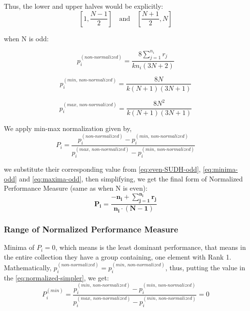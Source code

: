 \documentclass[a4paper,fleqn,review]{cas-sc}
\begin{document}
Thus, the lower and upper halves would be explicitly:
\[
\left[1, \frac{N-1}{2}\right] \quad \text{and} \quad \left[\frac{N+1}{2}, N\right]
\]

when N is odd:

\begin{equation}
	\label{eq:even-SUDH-odd}
	p_i^{(non\text{-}normalized)} = \frac{8 \sum_{j=1}^{n_i} r_j}{k n_i (3N + 2)}
\end{equation}

\begin{equation}
	\label{eq:minima-odd}
	p_i^{(min, \, non\text{-}normalized)} = \frac{8N}{k (N+1)(3N+1)}
\end{equation}

\begin{equation}
	\label{eq:maxima-odd}
	p_i^{(max, \, non\text{-}normalized)} = \frac{8N^2}{k (N+1)(3N+1)}
\end{equation}


We apply min-max normalization given by,
\begin{equation}
	P_i = \frac{p_i^{(non\text{-}normalized)} - p_i^{(min, \, non\text{-}normalized)}}{p_i^{(max, \, non\text{-}normalized)} - p_i^{(min, \, non\text{-}normalized)}}
\end{equation}

we substitute their corresponding value from
\autoref{eq:even-SUDH-odd}, \autoref{eq:minima-odd} and \autoref{eq:maxima-odd}, then simplifying, we get the final form of Normalized Performance Measure (same as when N is even):
\begin{equation}
	\boxed{
		\mathbf{
			P_i = \frac{-n_i +  \sum\limits_{j=1}^{n_i} r_j}{n_i \cdot (N - 1)}}
	}
\end{equation}


\subsubsection{Range of Normalized Performance Measure}
Minima of $P_i = 0$, which means is the least dominant performance, that means in the entire collection they have a group containing, one element with Rank 1. Mathematically, $p_i^{(non\text{-}normalized)} =  p_i^{(min, \, non\text{-}normalized)}$, thus, putting the value in the \autoref{eq:normalized-simpler}, we get:
\begin{equation}
	P_i^{(min)} = \frac{p_i^{(min, \, non\text{-}normalized)} - p_i^{(min, \, non\text{-}normalized)}}{p_i^{(max, \, non\text{-}normalized)} - p_i^{(min, \, non\text{-}normalized)}} = 0
\end{equation}
\end{document}
